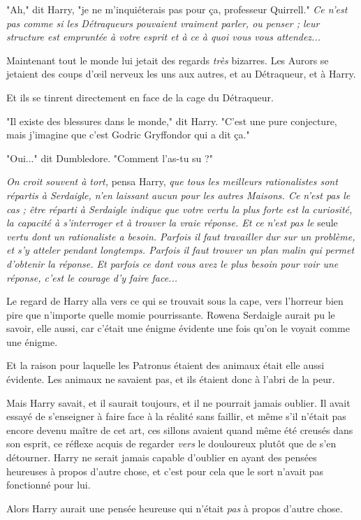 "Ah," dit Harry, "je ne m'inquiéterais pas pour ça, professeur Quirrell." \emph{Ce n'est pas comme si les Détraqueurs pouvaient vraiment parler, ou penser ; leur structure est empruntée à votre esprit et à ce à quoi vous vous attendez...} 

Maintenant tout le monde lui jetait des regards \emph{très}  bizarres. Les Aurors se jetaient des coups d'œil nerveux les uns aux autres, et au Détraqueur, et à Harry.

Et ils se tinrent directement en face de la cage du Détraqueur.

"Il existe des blessures dans le monde," dit Harry. "C'est une pure conjecture, mais j'imagine que c'est Godric Gryffondor qui a dit ça."

"Oui..." dit Dumbledore. "Comment l'as-tu su ?"

\emph{On croit souvent à tort,}  pensa Harry, \emph{que tous les meilleurs rationalistes sont répartis à Serdaigle, n'en laissant aucun pour les autres Maisons. Ce n'est pas le cas ; être réparti à Serdaigle indique que votre vertu la plus forte est la curiosité, la capacité à s'interroger et à trouver la vraie réponse. Et ce n'est pas le } seule\emph{ vertu dont un rationaliste a besoin. Parfois il faut travailler dur sur un problème, et s'y atteler pendant longtemps. Parfois il faut trouver un plan malin qui permet d'obtenir la réponse. Et parfois ce dont vous avez le plus besoin pour voir une réponse, c'est le courage d'y faire face...} 

Le regard de Harry alla vers ce qui se trouvait sous la cape, vers l'horreur bien pire que n'importe quelle momie pourrissante. Rowena Serdaigle aurait pu le savoir, elle aussi, car c'était une énigme évidente une fois qu'on le voyait comme une énigme.

Et la raison pour laquelle les Patronus étaient des animaux était elle aussi évidente. Les animaux ne savaient pas, et ils étaient donc à l'abri de la peur.

Mais Harry savait, et il saurait toujours, et il ne pourrait jamais oublier. Il avait essayé de s'enseigner à faire face à la réalité sans faillir, et même s'il n'était pas encore devenu maître de cet art, ces sillons avaient quand même été creusés dans son esprit, ce réflexe acquis de regarder \emph{vers}  le douloureux plutôt que de s'en détourner. Harry ne serait jamais capable d'oublier en ayant des pensées heureuses à propos d'autre chose, et c'est pour cela que le sort n'avait pas fonctionné pour lui.

Alors Harry aurait une pensée heureuse qui n'était \emph{pas}  à propos d'autre chose.

